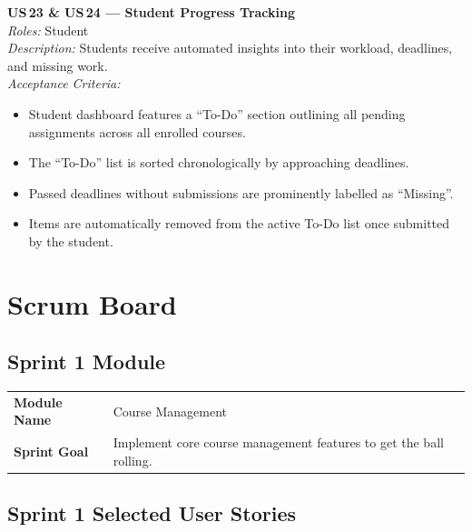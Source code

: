 \documentclass[11pt, legalpaper]{article}
\begin{document}
\begin{userstory}
  \textbf{US\,23 \& US\,24 — Student Progress Tracking}\\[4pt]
  \textit{Roles:} Student\\[2pt]
  \textit{Description:} Students receive automated insights into their
  workload, deadlines, and missing work.\\[4pt]
  \textit{Acceptance Criteria:}
  \begin{itemize}
    \item Student dashboard features a ``To-Do'' section outlining all pending
          assignments across all enrolled courses.
    \item The ``To-Do'' list is sorted chronologically by approaching
          deadlines.
    \item Passed deadlines without submissions are prominently labelled as
          ``Missing''.
    \item Items are automatically removed from the active To-Do list once
          submitted by the student.
  \end{itemize}
\end{userstory}

\section{Scrum Board}

\subsection{Sprint 1 Module}

\begin{center}
\begin{tabularx}{0.8\linewidth}{lX}
  \toprule
  \textbf{Module Name} & Course Management \\
  \textbf{Sprint Goal} & Implement core course management features to get the ball rolling. \\
  \bottomrule
\end{tabularx}
\end{center}

\subsection{Sprint 1 Selected User Stories}
\end{document}

